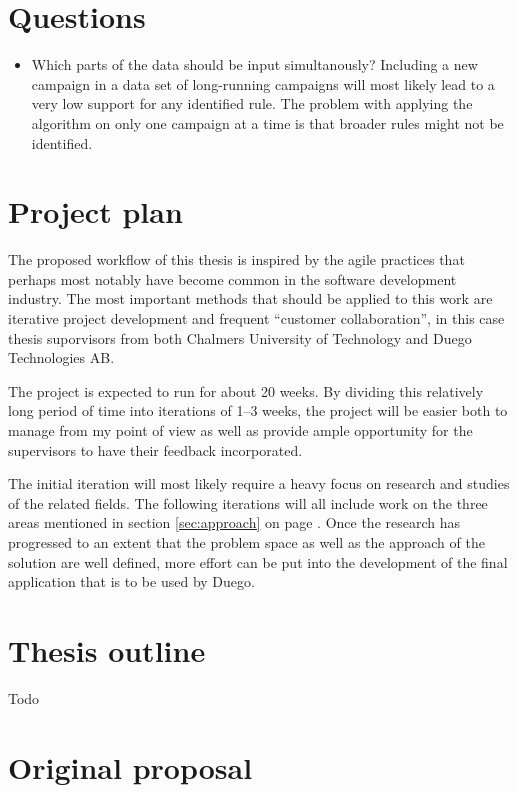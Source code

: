 \documentclass[a4paper]{article}
\begin{document}
\section{Questions}
\begin{itemize}
	\item Which parts of the data should be input simultanously? Including a new campaign in a data set of long-running
		campaigns will most likely lead to a very low support for any identified rule. The problem with applying the algorithm
		on only one campaign at a time is that broader rules might not be identified.
\end{itemize}

\section{Project plan}
The proposed workflow of this thesis is inspired by the agile practices that perhaps most notably have become
common in the software development industry. The most important methods that should be applied to this work are
iterative project development and frequent ``customer collaboration'', in this case thesis suporvisors from both
Chalmers University of Technology and Duego Technologies AB.

The project is expected to run for about 20 weeks. By dividing this relatively long period of time into iterations
of 1--3 weeks, the project will be easier both to manage from my point of view as well as provide ample opportunity
for the supervisors to have their feedback incorporated.

The initial iteration will most likely require a heavy focus on research and studies of the related fields. The following
iterations will all include work on the three areas mentioned in section \ref{sec:approach} on page \pageref{sec:approach}.
Once the research has progressed to an extent that the problem space as well as the approach of the solution are well defined,
more effort can be put into the development of the final application that is to be used by Duego.

\section{Thesis outline}
Todo

\section{Original proposal}
\end{document}
